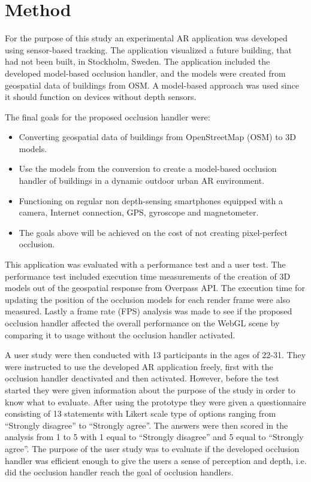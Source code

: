 \section{Method}
For the purpose of this study an experimental AR application was developed using sensor-based tracking. The application visualized a future building, that had not been built, in Stockholm, Sweden. The application included the developed model-based occlusion handler, and the models were created from geospatial data of buildings from OSM. A model-based approach was used since it should function on devices without depth sensors. 

The final goals for the proposed occlusion handler were:
\begin{itemize}
\item Converting geospatial data of buildings from OpenStreetMap (OSM) to 3D models.
\item Use the models from the conversion to create a model-based occlusion handler of buildings in a dynamic outdoor urban AR environment.
\item Functioning on regular non depth-sensing smartphones equipped with a camera, Internet connection, GPS, gyroscope and magnetometer.
\item The goals above will be achieved on the cost of not creating pixel-perfect occlusion.
\end{itemize}

This application was evaluated with a performance test and a user test. The performance test included execution time measurements of the creation of 3D models out of the geospatial response from Overpass API. The execution time for updating the position of the occlusion models for each render frame were also measured. Lastly a frame rate (FPS) analysis was made to see if the proposed occlusion handler affected the overall performance on the WebGL scene by comparing it to usage without the occlusion handler activated.

A user study were then conducted with 13 participants in the ages of 22-31. They were instructed to use the developed AR application freely, first with the occlusion handler deactivated and then activated. However, before the test started they were given information about the purpose of the study in order to know what to evaluate. After using the prototype they were given a questionnaire consisting of 13 statements with Likert scale \cite{likert1932technique} type of options ranging from ``Strongly disagree'' to ``Strongly agree''. The answers were then scored in the analysis from 1 to 5 with 1 equal to ``Strongly disagree'' and 5 equal to ``Strongly agree''. The purpose of the user study was to evaluate if the developed occlusion handler was efficient enough to give the users a sense of perception and depth, i.e. did the occlusion handler reach the goal of occlusion handlers. 

